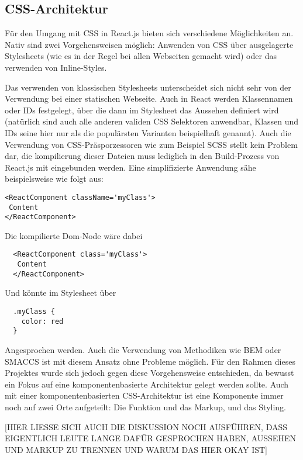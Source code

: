 \subsection{CSS-Architektur}
Für den Umgang mit CSS in React.js bieten sich verschiedene Möglichkeiten an. Nativ sind zwei Vorgehensweisen möglich: Anwenden von CSS über ausgelagerte Stylesheets (wie es in der Regel bei allen Webseiten gemacht wird) oder das verwenden von Inline-Styles.

Das verwenden von klassischen Stylesheets unterscheidet sich nicht sehr von der Verwendung bei einer statischen Webseite. Auch in React werden Klassennamen oder IDs festgelegt, über die dann im Stylesheet das Aussehen definiert wird (natürlich sind auch alle anderen validen CSS Selektoren anwendbar, Klassen und IDs seine hier nur als die populärsten Varianten beispielhaft genannt).
Auch die Verwendung von CSS-Präsporzessoren wie zum Beispiel SCSS stellt kein Problem dar, die kompilierung dieser Dateien muss lediglich in den Build-Prozess von React.js mit eingebunden werden. Eine simplifizierte Anwendung sähe beispielsweise wie folgt aus:

\begin{lstlisting}
<ReactComponent className='myClass'>
 Content
</ReactComponent>
\end{lstlisting}

Die kompilierte Dom-Node wäre dabei

\begin{lstlisting}
  <ReactComponent class='myClass'>
   Content
  </ReactComponent>
\end{lstlisting}

Und könnte im Stylesheet über

\begin{lstlisting}
  .myClass {
    color: red
  }
\end{lstlisting}

Angesprochen werden. Auch die Verwendung von Methodiken wie BEM oder SMACCS ist mit diesem Ansatz ohne Probleme möglich.
Für den Rahmen dieses Projektes wurde sich jedoch gegen diese Vorgehensweise entschieden, da bewusst ein Fokus auf eine komponentenbasierte Architektur gelegt werden sollte. Auch mit einer komponentenbasierten CSS-Architektur ist eine Komponente immer noch auf zwei Orte aufgeteilt: Die Funktion und das Markup, und das Styling.

[HIER LIESSE SICH AUCH DIE DISKUSSION NOCH AUSFÜHREN, DASS EIGENTLICH LEUTE LANGE DAFÜR GESPROCHEN HABEN, AUSSEHEN UND MARKUP ZU TRENNEN UND WARUM DAS HIER OKAY IST]

